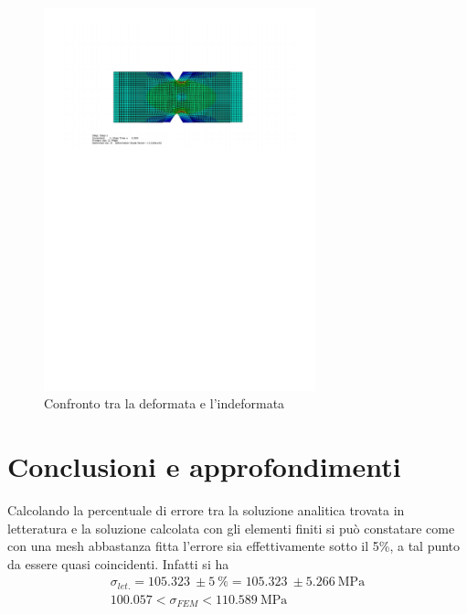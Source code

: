 \begin{figure}[htb]
    \centering
    \includegraphics[width=0.7\textwidth]{rel2/img2/DeformataIndeformata.pdf}
    \caption{Confronto tra la deformata e l'indeformata}
    \label{fig:DeformataIndeformata}
\end{figure}
\section{Conclusioni e approfondimenti}
Calcolando la percentuale di errore tra la soluzione analitica trovata in letteratura e la soluzione calcolata con gli elementi finiti si può constatare come con una mesh abbastanza fitta l’errore sia effettivamente sotto il 5\%, a tal punto da essere quasi coincidenti.
Infatti si ha
\begin{gather*}
    \sigma_{let.} = \SI{105.323}{} \pm \SI{5}{\%} = \SI{105.323}{} \pm \SI{5.266}{\mega\pascal} \\
    100.057 < \sigma_{FEM} < \SI{110.589}{\mega\pascal}
\end{gather*}

